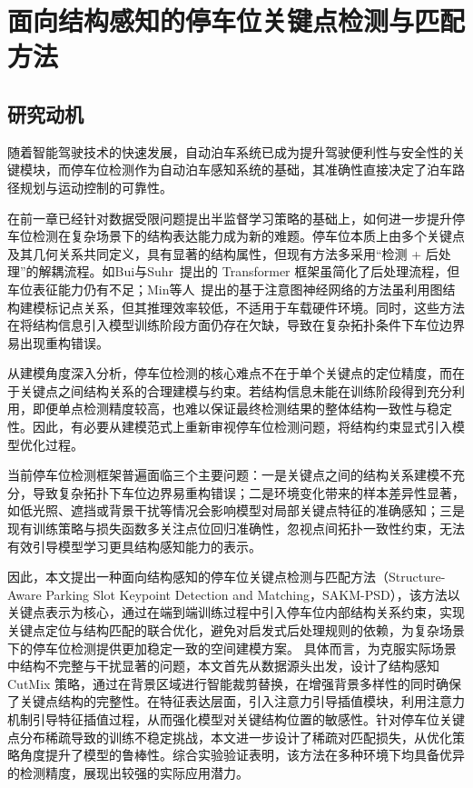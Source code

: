  \setlength{\baselineskip}{20pt}
\chapter{面向结构感知的停车位关键点检测与匹配方法}
\label{cha:chap3}

\section{研究动机}
随着智能驾驶技术的快速发展，自动泊车系统已成为提升驾驶便利性与安全性的关键模块，而停车位检测作为自动泊车感知系统的基础，其准确性直接决定了泊车路径规划与运动控制的可靠性。

在前一章已经针对数据受限问题提出半监督学习策略的基础上，如何进一步提升停车位检测在复杂场景下的结构表达能力成为新的难题。停车位本质上由多个关键点及其几何关系共同定义，具有显著的结构属性，但现有方法多采用“检测 + 后处理”的解耦流程。如Bui与Suhr~\cite{bui2023transformer}提出的 Transformer 框架虽简化了后处理流程，但车位表征能力仍有不足；Min等人~\cite{min2021attentional}提出的基于注意图神经网络的方法虽利用图结构建模标记点关系，但其推理效率较低，不适用于车载硬件环境。同时，这些方法在将结构信息引入模型训练阶段方面仍存在欠缺，导致在复杂拓扑条件下车位边界易出现重构错误。

从建模角度深入分析，停车位检测的核心难点不在于单个关键点的定位精度，而在于关键点之间结构关系的合理建模与约束。若结构信息未能在训练阶段得到充分利用，即便单点检测精度较高，也难以保证最终检测结果的整体结构一致性与稳定性。因此，有必要从建模范式上重新审视停车位检测问题，将结构约束显式引入模型优化过程。

当前停车位检测框架普遍面临三个主要问题：一是关键点之间的结构关系建模不充分，导致复杂拓扑下车位边界易重构错误；二是环境变化带来的样本差异性显著，如低光照、遮挡或背景干扰等情况会影响模型对局部关键点特征的准确感知；三是现有训练策略与损失函数多关注点位回归准确性，忽视点间拓扑一致性约束，无法有效引导模型学习更具结构感知能力的表示。

因此，本文提出一种面向结构感知的停车位关键点检测与匹配方法（Structure-Aware Parking Slot Keypoint Detection and Matching，SAKM-PSD），该方法以关键点表示为核心，通过在端到端训练过程中引入停车位内部结构关系约束，实现关键点定位与结构匹配的联合优化，避免对启发式后处理规则的依赖，为复杂场景下的停车位检测提供更加稳定一致的空间建模方案。
具体而言，为克服实际场景中结构不完整与干扰显著的问题，本文首先从数据源头出发，设计了结构感知 CutMix 策略，通过在背景区域进行智能裁剪替换，在增强背景多样性的同时确保了关键点结构的完整性。在特征表达层面，引入注意力引导插值模块，利用注意力机制引导特征插值过程，从而强化模型对关键结构位置的敏感性。针对停车位关键点分布稀疏导致的训练不稳定挑战，本文进一步设计了稀疏对匹配损失，从优化策略角度提升了模型的鲁棒性。综合实验验证表明，该方法在多种环境下均具备优异的检测精度，展现出较强的实际应用潜力。


